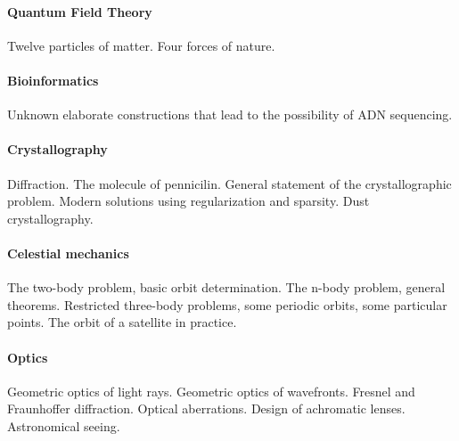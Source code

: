 \paragraph{Quantum Field Theory}
Twelve particles of matter.
Four forces of nature.

\paragraph{Bioinformatics}
Unknown elaborate constructions that lead to the possibility of ADN
sequencing.

\paragraph{Crystallography}
Diffraction.  The molecule of pennicilin.  General statement of the
crystallographic problem.  Modern solutions using regularization and
sparsity.  Dust crystallography.

\paragraph{Celestial mechanics}
The two-body problem, basic orbit determination.  The n-body problem, general
theorems.  Restricted three-body problems, some periodic orbits, some
particular points.
The orbit of a satellite in practice.

\paragraph{Optics}
Geometric optics of light rays.
Geometric optics of wavefronts.
Fresnel and Fraunhoffer diffraction.
Optical aberrations.
Design of achromatic lenses.
Astronomical seeing.


